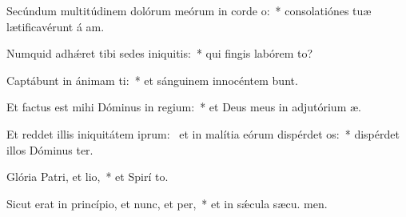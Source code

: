 \item Secúndum multitúdinem dolórum meórum in corde o:~* consolatiónes tuæ lætificavérunt á am.
\item Numquid adhǽret tibi sedes iniquitis:~* qui fingis labórem  to?
\item Captábunt in ánimam ti:~* et sánguinem innocéntem bunt.
\item Et factus est mihi Dóminus in regium:~* et Deus meus in adjutórium  æ.
\item Et reddet illis iniquitátem iprum:~\pscross{} et in malítia eórum dispérdet os:~* dispérdet illos Dóminus  ter.
\item Glória Patri, et lio,~* et Spirí to.
\item Sicut erat in princípio, et nunc, et per,~* et in sǽcula sæcu. men.
